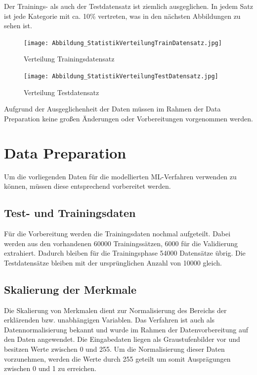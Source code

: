 \documentclass[12pt]{scrreprt}
\begin{document}
\newpage 
	
Der Trainings- als auch der Testdatensatz ist ziemlich ausgeglichen. In jedem Satz ist jede Kategorie mit ca. 10\% vertreten, was in den nächsten Abbildungen zu sehen ist.
	
\begin{figure}[h!]
	\centering
	\texttt{[image: Abbildung\_StatistikVerteilungTrainDatensatz.jpg]}
	\caption{Verteilung Trainingsdatensatz \cite{Abbildung8}}
	\label{fig:fig8}
\end{figure}
	
\begin{figure}[h!]
	\centering
	\texttt{[image: Abbildung\_StatistikVerteilungTestDatensatz.jpg]}
	\caption{Verteilung Testdatensatz \cite{Abbildung9}}
	\label{fig:fig9}
\end{figure}
\newpage
	
Aufgrund der Ausgeglichenheit der Daten müssen im Rahmen der Data Preparation keine großen Änderungen oder Vorbereitungen vorgenommen werden.
	
\section{Data Preparation}
	
Um die vorliegenden Daten für die modellierten ML-Verfahren verwenden zu können, müssen diese entsprechend vorbereitet werden. 
	
\subsection{Test- und Trainingsdaten}
Für die Vorbereitung werden die Trainingsdaten nochmal aufgeteilt. Dabei werden aus den vorhandenen 60000 Trainingssätzen, 6000 für die Validierung extrahiert. Dadurch bleiben für die Trainingsphase 54000 Datensätze übrig. Die Testdatensätze bleiben mit der ursprünglichen Anzahl von 10000 gleich.
	
\subsection{Skalierung der Merkmale}
	
Die Skalierung von Merkmalen dient zur Normalisierung des Bereichs der erklärenden bzw. unabhängigen Variablen. Das Verfahren ist auch als Datennormalisierung bekannt und wurde im Rahmen der Datenvorbereitung auf den Daten angewendet. Die Eingabedaten liegen als Graustufenbilder vor und besitzen Werte zwischen 0 und 255. Um die Normalisierung dieser Daten vorzunehmen, werden die Werte durch 255 geteilt um somit Ausprägungen zwischen 0 und 1 zu erreichen. 
	
\end{document}
